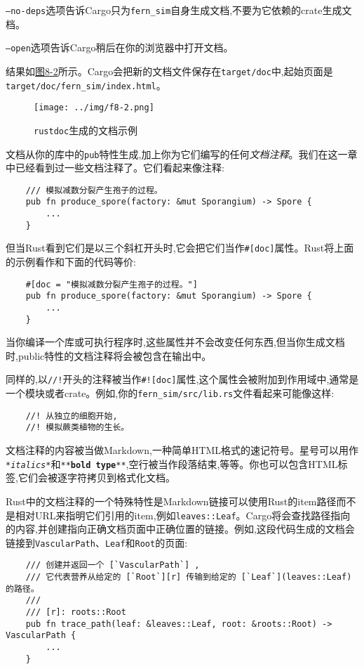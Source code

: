 \texttt{--no-deps}选项告诉Cargo只为\texttt{fern\_sim}自身生成文档,不要为它依赖的crate生成文档。

\texttt{--open}选项告诉Cargo稍后在你的浏览器中打开文档。

结果如\hyperref[f8-2]{图8-2}所示。Cargo会把新的文档文件保存在\texttt{target/doc}中,起始页面是\\
\texttt{target/doc/fern\_sim/index.html}。

\begin{figure}[htbp]
    \centering
    \texttt{[image: ../img/f8-2.png]}
    \caption{\texttt{rustdoc}生成的文档示例}
    \label{f8-2}
\end{figure}

文档从你的库中的\texttt{pub}特性生成,加上你为它们编写的任何\emph{文档注释}。我们在这一章中已经看到过一些文档注释了。它们看起来像注释:
\begin{verbatim}
    /// 模拟减数分裂产生孢子的过程。
    pub fn produce_spore(factory: &mut Sporangium) -> Spore {
        ...
    }
\end{verbatim}
但当Rust看到它们是以三个斜杠开头时,它会把它们当作\texttt{\#[doc]}属性。Rust将上面的示例看作和下面的代码等价:
\begin{verbatim}
    #[doc = "模拟减数分裂产生孢子的过程。"]
    pub fn produce_spore(factory: &mut Sporangium) -> Spore {
        ...
    }
\end{verbatim}

当你编译一个库或可执行程序时,这些属性并不会改变任何东西,但当你生成文档时,public特性的文档注释将会被包含在输出中。

同样的,以\texttt{//!}开头的注释被当作\texttt{\#![doc]}属性,这个属性会被附加到作用域中,通常是一个模块或者crate。例如,你的\texttt{fern\_sim/src/lib.rs}文件看起来可能像这样:
\begin{verbatim}
    //! 从独立的细胞开始,
    //! 模拟蕨类植物的生长。
\end{verbatim}

文档注释的内容被当做Markdown,一种简单HTML格式的速记符号。星号可以用作\texttt{*\emph{italics}*}和\texttt{**\textbf{bold type}**},空行被当作段落结束,等等。你也可以包含HTML标签,它们会被逐字符拷贝到格式化文档。

Rust中的文档注释的一个特殊特性是Markdown链接可以使用Rust的item路径而不是相对URL来指明它们引用的item,例如\texttt{leaves::Leaf}。Cargo将会查找路径指向的内容,并创建指向正确文档页面中正确位置的链接。例如,这段代码生成的文档会链接到\texttt{VascularPath}、\texttt{Leaf}和\texttt{Root}的页面:
\begin{verbatim}
    /// 创建并返回一个 [`VascularPath`] ,
    /// 它代表营养从给定的 [`Root`][r] 传输到给定的 [`Leaf`](leaves::Leaf) 的路径。
    ///
    /// [r]: roots::Root
    pub fn trace_path(leaf: &leaves::Leaf, root: &roots::Root) -> VascularPath {
        ...
    }
\end{verbatim}

